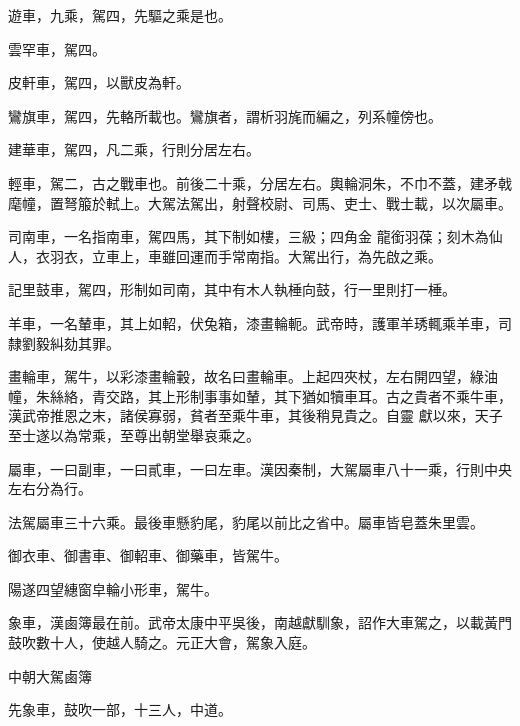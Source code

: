 \begin{pinyinscope}
 遊車，九乘，駕四，先驅之乘是也。



 雲罕車，駕四。



 皮軒車，駕四，以獸皮為軒。



 鸞旗車，駕四，先輅所載也。鸞旗者，謂析羽旄而編之，列系幢傍也。



 建華車，駕四，凡二乘，行則分居左右。



 輕車，駕二，古之戰車也。前後二十乘，分居左右。輿輪洞朱，不巾不蓋，建矛戟麾幢，置弩箙於軾上。大駕法駕出，射聲校尉、司馬、吏士、戰士載，以次屬車。



 司南車，一名指南車，駕四馬，其下制如樓，三級；四角金
 龍銜羽葆；刻木為仙人，衣羽衣，立車上，車雖回運而手常南指。大駕出行，為先啟之乘。



 記里鼓車，駕四，形制如司南，其中有木人執棰向鼓，行一里則打一棰。



 羊車，一名輦車，其上如軺，伏兔箱，漆畫輪軛。武帝時，護軍羊琇輒乘羊車，司隸劉毅糾劾其罪。



 畫輪車，駕牛，以彩漆畫輪轂，故名曰畫輪車。上起四夾杖，左右開四望，綠油幢，朱絲絡，青交路，其上形制事事如輦，其下猶如犢車耳。古之貴者不乘牛車，漢武帝推恩之末，諸侯寡弱，貧者至乘牛車，其後稍見貴之。自靈
 獻以來，天子至士遂以為常乘，至尊出朝堂舉哀乘之。



 屬車，一曰副車，一曰貳車，一曰左車。漢因秦制，大駕屬車八十一乘，行則中央左右分為行。



 法駕屬車三十六乘。最後車懸豹尾，豹尾以前比之省中。屬車皆皂蓋朱里雲。



 御衣車、御書車、御軺車、御藥車，皆駕牛。



 陽遂四望繐窗皁輪小形車，駕牛。



 象車，漢鹵簿最在前。武帝太康中平吳後，南越獻馴象，詔作大車駕之，以載黃門鼓吹數十人，使越人騎之。元正大會，駕象入庭。



 中朝大駕鹵簿



 先象車，鼓吹一部，十三人，中道。




\end{pinyinscope}
